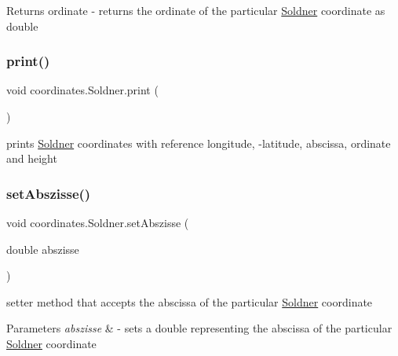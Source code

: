 \begin{DoxyReturn}{Returns}
ordinate -\/ returns the ordinate of the particular \hyperlink{classcoordinates_1_1_soldner}{Soldner} coordinate as double 
\end{DoxyReturn}
\mbox{\label{classcoordinates_1_1_soldner_a672aec8c4424e5a066f272d4864e8813}} 
\subsubsection{\texorpdfstring{print()}{print()}}
{\footnotesize\ttfamily void coordinates.\+Soldner.\+print (\begin{DoxyParamCaption}{ }\end{DoxyParamCaption})}



prints \hyperlink{classcoordinates_1_1_soldner}{Soldner} coordinates with reference longitude, -\/latitude, abscissa, ordinate and height 

\mbox{\label{classcoordinates_1_1_soldner_ab1de539c6b4d0855debaa87339edbedd}} 
\subsubsection{\texorpdfstring{set\+Abszisse()}{setAbszisse()}}
{\footnotesize\ttfamily void coordinates.\+Soldner.\+set\+Abszisse (\begin{DoxyParamCaption}\item[{double}]{abszisse }\end{DoxyParamCaption})}



setter method that accepts the abscissa of the particular \hyperlink{classcoordinates_1_1_soldner}{Soldner} coordinate 


\begin{DoxyParams}{Parameters}
{\em abszisse} & -\/ sets a double representing the abscissa of the particular \hyperlink{classcoordinates_1_1_soldner}{Soldner} coordinate \\
\hline
\end{DoxyParams}
\mbox{\label{classcoordinates_1_1_soldner_a597b8292c312c36e547df97285e55d4a}} 
